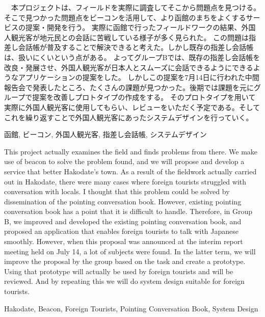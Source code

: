 \documentclass[12pt,papersize]{jsbook}
\newcounter{hoge}
\newcommand{\fake}[1]{\whiledo{\thehoge<70}{#1\stepcounter{hoge}}%
  \setcounter{hoge}{0}}
\begin{document}
%
\maketitle

\frontmatter

\begin{jabstract}
  　本プロジェクトは、フィールドを実際に調査してそこから問題点を見つける。そこで見つかった問題点をビーコンを活用して、より函館のまちをよくするサービスの提案・開発を行う。
  実際に函館で行ったフィールドワークの結果、外国人観光客が地元民との会話に苦戦している様子が多く見られた。
  この問題は指差し会話帳が普及することで解決できると考えた。しかし既存の指差し会話帳は、扱いにくいという点がある。
  よってグループBでは、既存の指差し会話帳を改良・発展させ、外国人観光客が日本人とスムーズに会話できるようにできるようなアプリケーションの提案をした。
  しかしこの提案を7月14日に行われた中間報告会で発表したところ、たくさんの課題が見つかった。後期では課題を元にグループで提案を改善しプロトタイプの作成をする。
  そのプロトタイプを用いて実際に外国人観光客に使用してもらい、レビューをいただく予定である。そしてこれを繰り返すことで外国人観光客にあったシステムデザインを行っていく。
\begin{jkeyword}
函館, ビーコン, 外国人観光客, 指差し会話帳, システムデザイン
\end{jkeyword}
\end{jabstract}

\begin{eabstract}
   This project actually examines the field and finds problems from there.
   We make use of beacon to solve the problem found, and we will propose and develop a service that better Hakodate's town.
  As a result of the fieldwork actually carried out in Hakodate, there were many cases where foreign tourists struggled with conversation with locals.
  I thought that this problem could be solved by dissemination of the pointing conversation book. However, existing pointing conversation book has a point that it is difficult to handle. Therefore, in Group B, we improved and developed the existing pointing conversation book, and proposed an application that enables foreign tourists to talk with Japanese smoothly. However, when this proposal was announced at the interim report meeting held on July 14, a lot of subjects were found. In the latter term, we will improve the proposal by the group based on the task and create a prototype. Using that prototype will actually be used by foreign tourists and will be reviewed.
  And by repeating this we will do system design suitable for foreign tourists.
\begin{ekeyword}
  Hakodate, Beacon, Foreign Tourists, Pointing Conversation Book, System Design
\end{ekeyword}
\end{eabstract}
\end{document}
